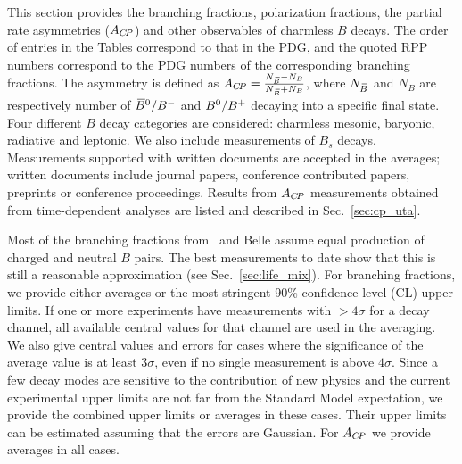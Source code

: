 

\label{sec:rare}

This section provides the branching fractions, polarization 
fractions, the partial rate asymmetries ($A_{C\!P}$) and other observables of charmless 
$B$ decays.
The order of entries in the Tables correspond to that in the PDG, and the quoted RPP numbers correspond to the PDG numbers of the corresponding branching fractions.
The asymmetry is defined as 
$A_{C\!P} = \frac{N_{\kern 0.18em\overline{\kern -0.18em B}{}} -N_B}{N_{\kern 0.18em\overline{\kern -0.18em B}{}} +N_B}$, where $N_{\kern 0.18em\overline{\kern -0.18em B}{}}$ 
and $N_B$ are respectively number of $\kern 0.18em\overline{\kern -0.18em B}{}^0/B^{-}$ and $B^0/B^{+}$ decaying
into a specific final state.
Four different $B$ decay categories are considered: 
charmless mesonic, baryonic, radiative and leptonic. We also include
measurements of $B_s$ decays.
Measurements supported with  written documents are accepted in  
the averages; written documents include journal papers, 
conference contributed papers, preprints or conference proceedings.  
Results from  $A_{C\!P}$ measurements  obtained from time-dependent analyses 
are listed and described in Sec.~\ref{sec:cp_uta}.

Most of the branching fractions from \babar\ and Belle assume equal production 
of charged and neutral $B$ pairs.  The best measurements to date show that this
is still a reasonable approximation (see Sec.~\ref{sec:life_mix}).
For branching fractions, we provide either averages or the most stringent
90\% confidence level (CL) upper limits.  If one or more experiments have
measurements with $>\!\!4 \sigma$ for a decay channel, all available central values
for that channel are used in the averaging.  We also give central values
and errors for cases where the significance of the average value is at
least $3 \sigma$, even if no single measurement is above $4 \sigma$. 
Since a few decay modes are sensitive to the contribution of
new physics and the current experimental upper limits are not far from the 
Standard Model expectation, we provide the combined upper limits or
averages in these cases.
Their upper limits can be estimated assuming that the errors are 
Gaussian.  For $A_{C\!P}$ we provide averages in all cases.  

